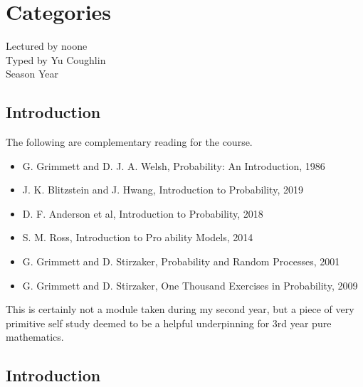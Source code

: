 \documentclass[../Year2.tex]{subfiles}
\begin{document}
\chapter{Categories}
\renewcommand*\thesection{\arabic{section}}
Lectured by noone \\ Typed by Yu Coughlin \\
Season Year

\section*{Introduction}

The following are complementary reading for the course.
\begin{itemize}
    \item G. Grimmett and D. J. A. Welsh, Probability: An Introduction, 1986
    \item J. K. Blitzstein and J. Hwang, Introduction to Probability, 2019
    \item D. F. Anderson et al, Introduction to Probability, 2018
    \item S. M. Ross, Introduction to Pro ability Models, 2014
    \item G. Grimmett and D. Stirzaker, Probability and Random Processes, 2001
    \item G. Grimmett and D. Stirzaker, One Thousand Exercises in Probability, 2009
\end{itemize}
This is certainly not a module taken during my second year, but a piece of very primitive self study deemed to be a helpful underpinning for 3rd year pure mathematics.

\tableofcontents\pagebreak


\section{Introduction}
\end{document}
